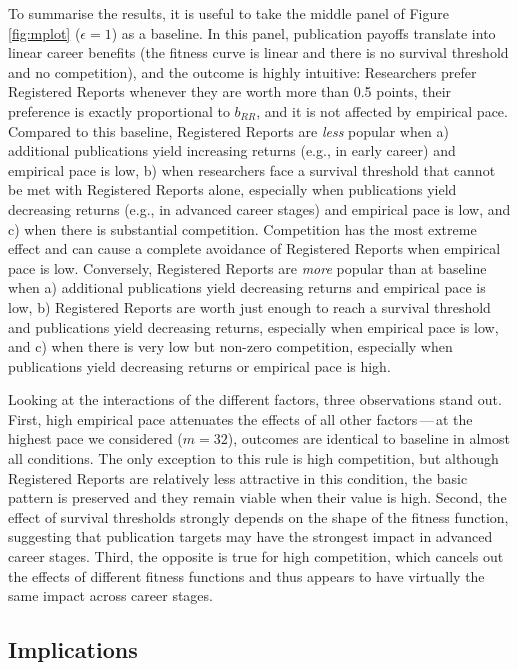 \documentclass[
  ,man,mask,floatsintext]{apa6}
\begin{document}
To summarise the results, it is useful to take
the middle panel of Figure \ref{fig:mplot} (\(\epsilon = 1\)) as a baseline.
In this panel, publication payoffs translate into linear career benefits (the fitness curve is linear and there is no survival threshold and no competition), and the outcome is highly intuitive:
Researchers prefer Registered Reports whenever they are worth more than 0.5 points, their preference is exactly proportional to \(b_{RR}\), and it is not affected by empirical pace.
Compared to this baseline, Registered Reports are \emph{less} popular when a) additional publications yield increasing returns (e.g., in early career) and empirical pace is low, b) when researchers face a survival threshold that cannot be met with Registered Reports alone, especially when publications yield decreasing returns (e.g., in advanced career stages) and empirical pace is low, and c) when there is substantial competition.
Competition has the most extreme effect and can cause a complete avoidance of Registered Reports when empirical pace is low.
Conversely, Registered Reports are \emph{more} popular than at baseline when a) additional publications yield decreasing returns and empirical pace is low, b) Registered Reports are worth just enough to reach a survival threshold and publications yield decreasing returns, especially when empirical pace is low, and c) when there is very low but non-zero competition, especially when publications yield decreasing returns or empirical pace is high.

Looking at the interactions of the different factors, three observations stand out.
First, high empirical pace attenuates the effects of all other factors\(\,\)---\(\,\)at the highest pace we considered (\(m = 32\)), outcomes are identical to baseline in almost all conditions.
The only exception to this rule is high competition, but although Registered Reports are relatively less attractive in this condition, the basic pattern is preserved and they remain viable when their value is high.
Second, the effect of survival thresholds strongly depends on the shape of the fitness function, suggesting that publication targets may have the strongest impact in advanced career stages.
Third, the opposite is true for high competition, which cancels out the effects of different fitness functions and thus appears to have virtually the same impact across career stages.

\hypertarget{implications}{%
\subsection{Implications}\label{implications}}
\end{document}
